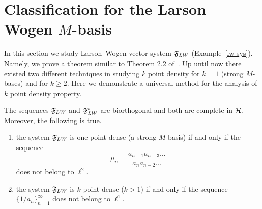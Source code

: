 \section{Classification for the Larson--Wogen $M$-basis}
  \label{section:lw-sys}
  In this section we study Larson--Wogen vector system $\fsys_{LW}$ (Example~\ref{lw-sys}).
  Namely, we prove a theorem similar to Theorem 2.2 of~\cite{katavolos}.
  Up until now there existed two different techniques in studying $k$ point density for $k=1$ (strong $M$-bases) and for $k\geq2$.
  Here we demonstrate a universal method for the analysis of $k$ point density property.
  \begin{theorem}
    \label{thm:katavolos}
    The sequences $\fsys_{LW}$ and $\fsys_{LW}^*$ are biorthogonal and both are complete in $\cal{H}$.
    Moreover, the following is true.
    \begin{enumerate}
      \item  the system $\fsys_{LW}$ is one point dense (a strong $M$-basis) if and only if the sequence
        \begin{equation}
          \mu_n = \frac{a_{n-1} a_{n-3} \dots}{a_{n} a_{n-2} \dots }
        \end{equation}
        does not belong to $\ell^2$.
      \item the system $\fsys_{LW}$ is $k$ point dense ($k > 1$) if and only if the sequence $\{1/a_n\}_{n=1}^\infty$ does not belong to $\ell^1$.
    \end{enumerate}
  \end{theorem}

